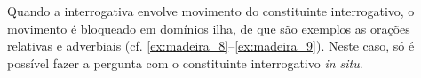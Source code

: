 \documentclass[output=paper]{LSP/langsci}
\begin{document}
Quando a interrogativa envolve movimento do constituinte interrogativo, o movimento é bloqueado em domínios ilha, de que são exemplos as orações relativas e adverbiais (cf. \ref{ex:madeira_8}--\ref{ex:madeira_9}). Neste caso, só é possível fazer a pergunta com o constituinte interrogativo \textit{in situ}.

\ea\label{ex:madeira_8}
\zl

\ea\label{ex:madeira_9}
\zl
\end{document}
